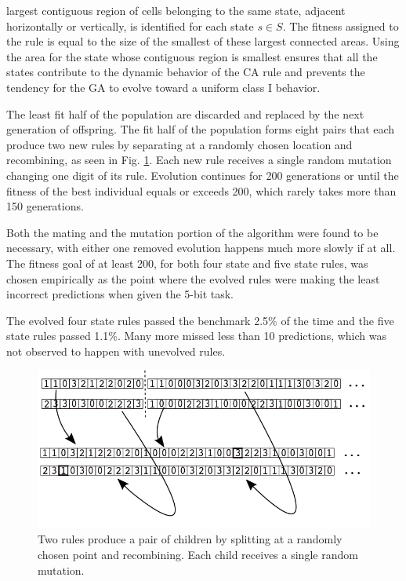 \documentclass{article}
\begin{document}
\begin{multicols}{2}
     largest contiguous region of cells belonging to the same state, adjacent 
     horizontally or vertically, is identified for each state $s \in S$. The 
     fitness assigned to the rule is equal to the size of the smallest of these 
     largest connected areas. Using the area for the state whose contiguous 
     region is smallest ensures that all the states contribute to the dynamic 
     behavior of the CA rule and prevents the tendency for the GA to evolve 
     toward a uniform class I behavior. \par The least fit half of the 
     population are discarded and replaced by the next generation of offspring.  
     The fit half of the population forms eight pairs that each produce two new 
     rules by separating at a randomly chosen location and recombining, as seen 
     in Fig. \ref{GA}. Each new rule receives a single random mutation changing 
     one digit of its rule. Evolution continues for 200 generations or until 
     the fitness of the best individual equals or exceeds 200, which rarely 
     takes more than 150 generations.  \par Both the mating and the mutation 
     portion of the algorithm were found to be necessary, with either one 
     removed evolution happens much more slowly if at all. The fitness goal of 
     at least 200, for both four state and five state rules, was chosen 
     empirically as the point where the evolved rules were making the least 
     incorrect predictions when given the 5-bit task. \par
     The evolved four state rules passed the benchmark 2.5\% of the time and 
     the five state rules passed 1.1\%. Many more missed less than 10 
     predictions, which was not observed to happen with unevolved rules.




\begin{figure}[H]
  \centering
    \includegraphics[width=\linewidth]{GA.png}
  \caption{Two rules produce a pair of children by splitting at a randomly 
      chosen point and recombining. Each child receives a single random 
          mutation.}
  \label{GA}
  \end{figure}


\end{multicols}
\end{document}

